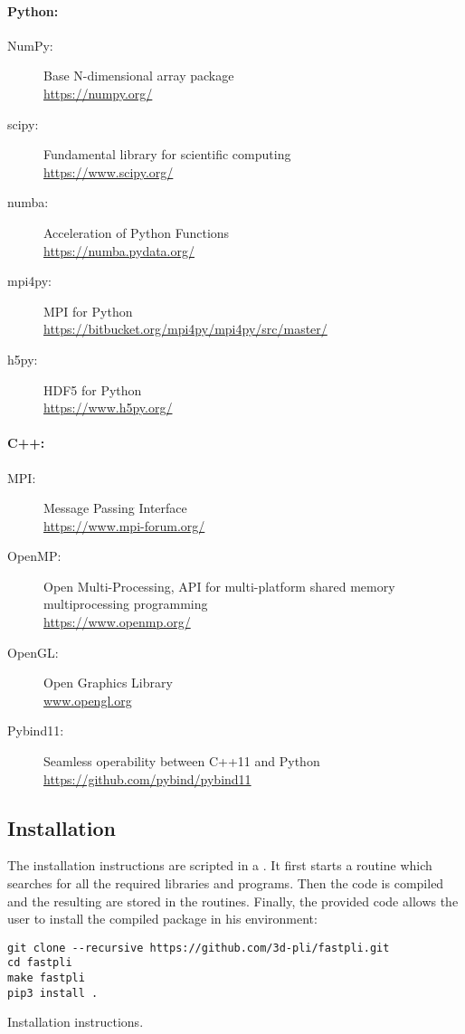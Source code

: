 \paragraph{Python:}
\begin{description}
\item[NumPy:] Base N-dimensional array package \cite{2019arXiv190710121V}\\
\url{https://numpy.org/}
\item[scipy:] Fundamental library for scientific computing \cite{2019arXiv190710121V}\\
\url{https://www.scipy.org/}
\item[numba:] Acceleration of Python Functions \cite{Lam2015}\\
\url{https://numba.pydata.org/}
\item[mpi4py:] MPI for Python \cite{Dalcn2005, Dalcn2008, Dalcin2011}\\
\url{https://bitbucket.org/mpi4py/mpi4py/src/master/}
\item[h5py:] HDF5 for Python \cite{collette_python_hdf5_2014, hdf5}\\
\url{https://www.h5py.org/}
\end{description}
%
\newpage
\paragraph{C++:}
\begin{description}
\item[MPI:] Message Passing Interface \cite{message2015mpi}\\
\url{https://www.mpi-forum.org/}
\item[OpenMP:] Open Multi-Processing, API for multi-platform shared memory multiprocessing programming \cite{dagum1998openmp}\\
\url{https://www.openmp.org/}
\item[OpenGL:] Open Graphics Library \cite{khronos}\\
\url{www.opengl.org}
\item[Pybind11:] Seamless operability between C++11 and Python \cite{pybind11}\\ \url{https://github.com/pybind/pybind11}
\end{description}
%
%
%
\subsection{Installation}
%
The installation instructions are scripted in a .
It first starts a  routine which searches for all the required libraries and programs.
Then the \cpp{} code is compiled and the resulting  are stored in the \python{} routines.
Finally, the provided code  allows the user to install the compiled package in his environment:
%
\begin{lstfloat}[!ht]
\lstset{style=common}
\begin{lstlisting}
git clone --recursive https://github.com/3d-pli/fastpli.git
cd fastpli
make fastpli
pip3 install .
\end{lstlisting}
\caption{Installation instructions.}
\end{lstfloat}
%
%
%
